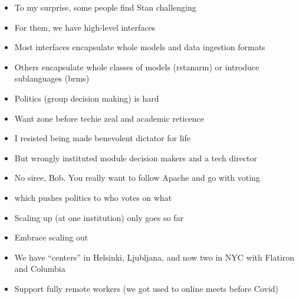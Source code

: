 \documentclass[9pt]{report}
\begin{document}
\begin{itemize}
\item To my surprise, some people find Stan challenging
\item For them, we have high-level interfaces
\item Most interfaces encapsulate whole models and data ingestion formats
\item Others encapsulate whole classes of models (rstanarm) or
  introduce sublanguages (brms)
\end{itemize}

\begin{itemize}
\item Politics (group decision making) is hard
\item Want zone before techie zeal and academic reticence
\item I resisted being made benevolent dictator for life
\item But wrongly instituted module decision makers and a tech
  director
\item No siree, Bob. You really want to follow Apache and go with voting
\item which pushes politics to who votes on what
\end{itemize}

\begin{itemize}
\item Scaling up (at one institution) only goes so far
\item Embrace scaling out
\item We have ``centers'' in Helsinki, Ljubljana, and now two in NYC
  with Flatiron and Columbia
\item Support fully remote workers (we got used to online meets before Covid)
\end{itemize}
\end{document}
